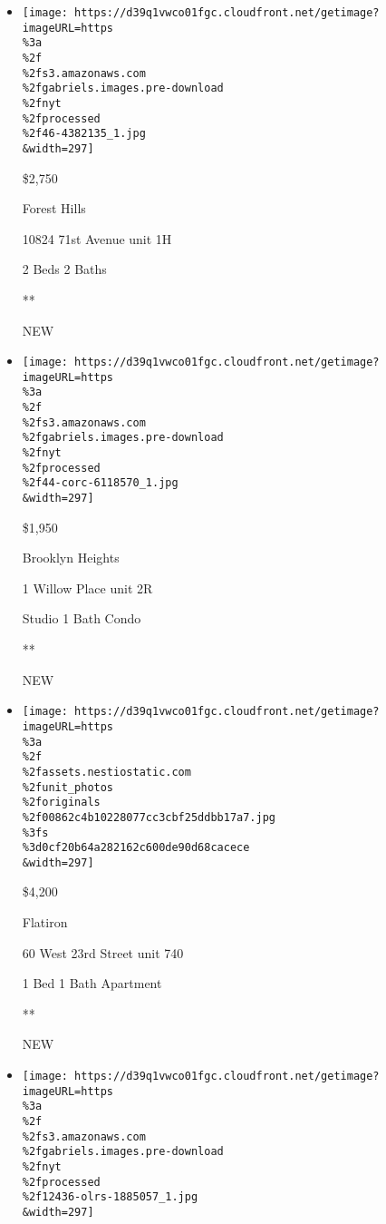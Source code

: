 \begin{itemize}
\item
  \href{/real-estate/usa/ny/queens/forest-hills/homes-for-rent/10824-71st-avenue/46-4382135?}{}

  \texttt{[image: https://d39q1vwco01fgc.cloudfront.net/getimage?imageURL=https\\\%3a\\\%2f\\\%2fs3.amazonaws.com\\\%2fgabriels.images.pre-download\\\%2fnyt\\\%2fprocessed\\\%2f46-4382135\_1.jpg\\\&width=297]}

  \$2,750

  Forest Hills

  10824 71st Avenue unit 1H

  2 Beds \textbar{} 2 Baths \textbar{}

  **

  NEW
\item
  \href{/real-estate/usa/ny/brooklyn/brooklyn-heights/homes-for-rent/1-willow-place/44-CORC-6118570?}{}

  \texttt{[image: https://d39q1vwco01fgc.cloudfront.net/getimage?imageURL=https\\\%3a\\\%2f\\\%2fs3.amazonaws.com\\\%2fgabriels.images.pre-download\\\%2fnyt\\\%2fprocessed\\\%2f44-corc-6118570\_1.jpg\\\&width=297]}

  \$1,950

  Brooklyn Heights

  1 Willow Place unit 2R

  Studio \textbar{} 1 Bath \textbar{} Condo

  **

  NEW
\item
  \href{/real-estate/usa/ny/new-york/flatiron/homes-for-rent/60-west-23rd-street/14668-NEST-115288?}{}

  \texttt{[image: https://d39q1vwco01fgc.cloudfront.net/getimage?imageURL=https\\\%3a\\\%2f\\\%2fassets.nestiostatic.com\\\%2funit\_photos\\\%2foriginals\\\%2f00862c4b10228077cc3cbf25ddbb17a7.jpg\\\%3fs\\\%3d0cf20b64a282162c600de90d68cacece\\\&width=297]}

  \$4,200

  Flatiron

  60 West 23rd Street unit 740

  1 Bed \textbar{} 1 Bath \textbar{} Apartment

  **

  NEW
\item
  \href{/real-estate/usa/ny/new-york/upper-east-side/homes-for-rent/210-east-63rd-street/12436-OLRS-1885057?}{}

  \texttt{[image: https://d39q1vwco01fgc.cloudfront.net/getimage?imageURL=https\\\%3a\\\%2f\\\%2fs3.amazonaws.com\\\%2fgabriels.images.pre-download\\\%2fnyt\\\%2fprocessed\\\%2f12436-olrs-1885057\_1.jpg\\\&width=297]}


\end{itemize}
